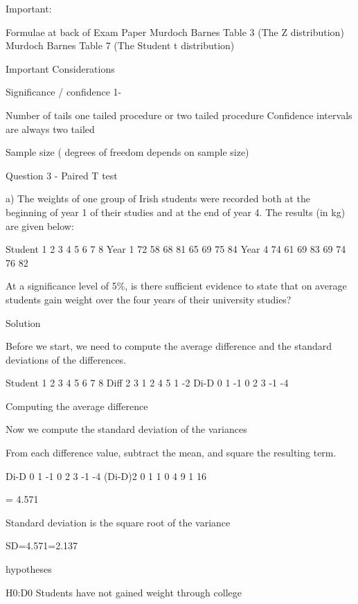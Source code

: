 \documentclass[12pt]{report}
\begin{document}
Important:

Formulae at back of Exam Paper
Murdoch Barnes Table 3 (The Z distribution)
Murdoch Barnes Table 7 (The Student t distribution)

Important Considerations

Significance     /    confidence 1-

Number of tails   
one tailed procedure or two tailed procedure
Confidence intervals are always two tailed

Sample size   ( degrees of freedom depends on sample size)



Question 3 - Paired T test

a) The weights of one group of Irish students were recorded both at the beginning of year 1 of their studies and at the end of year 4.
The results (in kg) are given below:

Student
1
2
3
4
5
6
7
8
Year 1
72
58
68
81
65
69
75
84
Year 4
74
61
69
83
69
74
76
82

At a significance level of 5\%, is there sufficient evidence to state that on average students gain weight over the four years of their university studies?

Solution

Before we start, we need to compute the average difference and the standard deviations of the differences. 

Student
1
2
3
4
5
6
7
8
Diff
2
3
1
2
4
5
1
-2
Di-D
0
1
-1
0
2
3
-1
-4


Computing the average difference




Now we compute the standard deviation of the variances

From each difference value, subtract the mean, and square the resulting term.


Di-D
0
1
-1
0
2
3
-1
-4
(Di-D)2
0
1
1
0
4
9
1
16





= 4.571

Standard deviation is the square root of the variance

SD=4.571=2.137



hypotheses

H0:D0    Students have not gained weight through college
\end{document}
